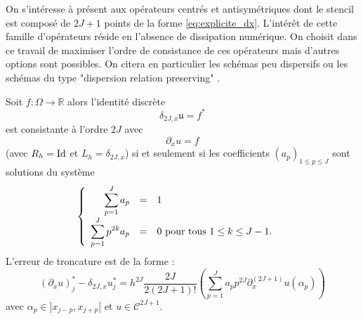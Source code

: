 On s'intéresse à présent aux opérateurs centrés et antisymétriques dont le stencil est composé de $2J+1$ points de la forme \eqref{eq:explicite_dx}. L'intérêt de cette famille d'opérateurs réside en l'absence de dissipation numérique. On choisit dans ce travail de maximiser l'ordre de consistance de ces opérateurs mais d'autres options sont possibles. On citera en particulier les schémas peu dispersifs \cite{Bogey2004} ou les schémas du type "dispersion relation preserving" \cite{Tam1993}.

\begin{theoreme}
Soit $f : \Omega \rightarrow \mathbb{R}$ alors l'identité discrète
\begin{equation}
\delta_{2J,x} \mathfrak{u} = f^*
\end{equation}
est consistante à l'ordre $2J$ avec 
\begin{equation}
\partial_x u = f
\end{equation}
(avec $R_h = \text{Id}$ et $L_h = \delta_{2J,x}$) si et seulement si les coefficients $(a_p)_{1 \leq p \leq J}$ sont solutions du système
\begin{equation}
\left\lbrace
\begin{array}{rcll}
\displaystyle\sum\limits_{p=1}^J a_p & = & 1 & \\
\displaystyle\sum\limits_{p=1}^J p^{2k} a_p & = & 0 \text{ pour tous } 1 \leq k \leq J-1.
\end{array}
\right.
\label{eq:syst_opexplicite_P}
\end{equation}
L'erreur de troncature est de la forme :
\begin{equation}
\left(\partial_x u \right)_j^* - \delta_{2J,x} u^*_j = h^{2J}  \dfrac{2J}{2(2J+1)!}   \left(  \sum_{p=1}^J a_p p^{2J} \partial^{(2J+1)}_x u(\alpha_p) \right)
\end{equation} 
avec $\alpha_p \in ]x_{j-p}, x_{j+p}[$ et $u \in \mathcal{C}^{2J+1}$.
\label{th:consistance_delta_x_explicite}
\end{theoreme}


